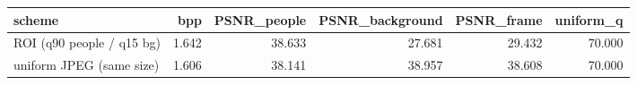 \begin{tabular}{lrrrrr}
\toprule
scheme & bpp & PSNR_people & PSNR_background & PSNR_frame & uniform_q \\
\midrule
ROI (q90 people / q15 bg) & 1.642 & 38.633 & 27.681 & 29.432 & 70.000 \\
uniform JPEG (same size) & 1.606 & 38.141 & 38.957 & 38.608 & 70.000 \\
\bottomrule
\end{tabular}
